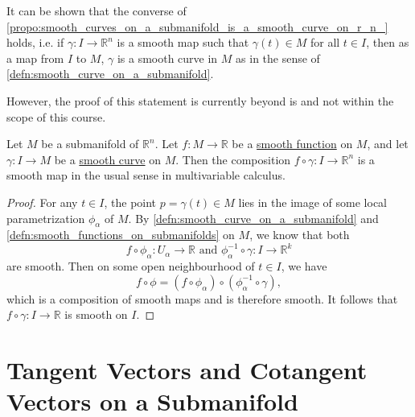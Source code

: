 \documentclass[notoc,notitlepage]{tufte-book}
\begin{document}
\begin{remark}
  It can be shown that the converse of
  \cref{propo:smooth_curves_on_a_submanifold_is_a_smooth_curve_on_r_n_} holds,
  i.e. if $\gamma : I \to \mathbb{R}^n$ is a smooth map such that $\gamma(t) \in
  M$ for all $t \in I$, then as a map from $I$ to $M$, $\gamma$ is a smooth
  curve in $M$ as in the sense of \cref{defn:smooth_curve_on_a_submanifold}.

  However, the proof of this statement is currently beyond is and not within the
  scope of this course.
\end{remark}

\begin{propo}\label{propo:composing_a_smooth_function_and_a_smooth_curve}
  Let $M$ be a submanifold of $\mathbb{R}^n$. Let $f : M \to \mathbb{R}$ be a
  \hyperref[defn:smooth_functions_on_submanifolds]{smooth function} on $M$, and
  let $\gamma : I \to M$ be a
  \hyperref[defn:smooth_curve_on_a_submanifold]{smooth curve} on $M$. Then the
  composition $f \circ \gamma : I \to \mathbb{R}^n$ is a smooth map in the usual
  sense in multivariable calculus.
\end{propo}

\begin{proof}
  For any $t \in I$, the point $p = \gamma(t) \in M$ lies in the image of some
  local parametrization $\phi_\alpha$ of $M$. By
  \cref{defn:smooth_curve_on_a_submanifold} and
  \cref{defn:smooth_functions_on_submanifolds} on $M$, we know that both
  \begin{equation*}
    f \circ \phi_\alpha : U_\alpha \to \mathbb{R} \text{ and } \phi_\alpha^{-1}
    \circ \gamma : I \to \mathbb{R}^k
  \end{equation*}
  are smooth. Then on some open neighbourhood of $t \in I$, we have
  \begin{equation*}
    f \circ \phi = (f \circ \phi_\alpha) \circ (\phi_\alpha^{-1} \circ \gamma),
  \end{equation*}
  which is a composition of smooth maps and is therefore smooth. It follows that
  $f \circ \gamma : I \to \mathbb{R}$ is smooth on $I$.
\end{proof}
 

\section{Tangent Vectors and Cotangent Vectors on a Submanifold}%
\label{sec:tangent_vectors_and_cotangent_vectors_on_a_submanifold}
\end{document}
